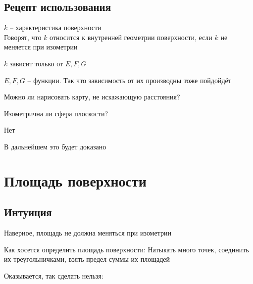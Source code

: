 \subsection{Рецепт использования}

\begin{definition}
	$ k $ -- характеристика поверхности \\
	Говорят, что $ k $ относится к внутренней геометрии поверхности, если $ k $ не меняется при изометрии
\end{definition}

\begin{restate}
	$ k $ зависит только от $ E, F, G $
\end{restate}

\begin{remark}
	$ E, F, G $ -- функции. Так что зависимость от их производны тоже пойдойдёт
\end{remark}

\begin{problem}
	Можно ли нарисовать карту, не искажающую расстояния?
\end{problem}

\begin{restate}
	Изометрична ли сфера плоскости?
\end{restate}

\begin{answer}
	Нет
\end{answer}

В дальнейшем это будет доказано

\section{Площадь поверхности}

\subsection{Интуиция}

Наверное, площадь не должна меняться при изометрии

\begin{undefthm}{Как хосется определить площадь поверхности:}
	Натыкать много точек, соединить их треугольничками, взять предел суммы их площадей
\end{undefthm}

Оказывается, так сделать нельзя:


